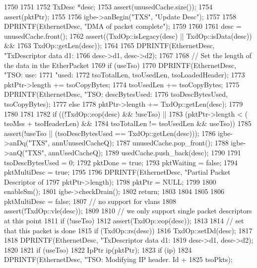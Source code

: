 \begin{DoxyCode}
1750 {
1751 
1752     TxDesc *desc;
1753     assert(unusedCache.size());
1754     assert(pktPtr);
1755 
1756     igbe->anBegin("TXS", "Update Desc");
1757 
1758     DPRINTF(EthernetDesc, "DMA of packet complete\n");
1759 
1760 
1761     desc = unusedCache.front();
1762     assert((TxdOp::isLegacy(desc) || TxdOp::isData(desc)) &&
1763            TxdOp::getLen(desc));
1764 
1765     DPRINTF(EthernetDesc, "TxDescriptor data d1: %
1766             desc->d1, desc->d2);
1767 
1768     // Set the length of the data in the EtherPacket
1769     if (useTso) {
1770         DPRINTF(EthernetDesc, "TSO: use: %
1771             "used: %
1772             tsoTotalLen, tsoUsedLen, tsoLoadedHeader);
1773         pktPtr->length += tsoCopyBytes;
1774         tsoUsedLen += tsoCopyBytes;
1775         DPRINTF(EthernetDesc, "TSO: descBytesUsed: %
1776             tsoDescBytesUsed, tsoCopyBytes);
1777     } else
1778         pktPtr->length += TxdOp::getLen(desc);
1779     
1780 
1781 
1782     if ((!TxdOp::eop(desc) && !useTso) || 
1783         (pktPtr->length < ( tsoMss + tsoHeaderLen) &&
1784          tsoTotalLen != tsoUsedLen && useTso)) {
1785         assert(!useTso || (tsoDescBytesUsed == TxdOp::getLen(desc)));
1786         igbe->anDq("TXS", annUnusedCacheQ);
1787         unusedCache.pop_front();
1788         igbe->anQ("TXS", annUsedCacheQ);
1789         usedCache.push_back(desc);
1790 
1791         tsoDescBytesUsed = 0;
1792         pktDone = true;
1793         pktWaiting = false;
1794         pktMultiDesc = true;
1795 
1796         DPRINTF(EthernetDesc, "Partial Packet Descriptor of %
1797                 pktPtr->length);
1798         pktPtr = NULL;
1799 
1800         enableSm();
1801         igbe->checkDrain();
1802         return;
1803     }
1804 
1805 
1806     pktMultiDesc = false;
1807     // no support for vlans
1808     assert(!TxdOp::vle(desc));
1809 
1810     // we only support single packet descriptors at this point
1811     if (!useTso)
1812         assert(TxdOp::eop(desc));
1813 
1814     // set that this packet is done
1815     if (TxdOp::rs(desc))
1816         TxdOp::setDd(desc);
1817 
1818     DPRINTF(EthernetDesc, "TxDescriptor data d1: %
1819             desc->d1, desc->d2);
1820 
1821     if (useTso) {
1822         IpPtr ip(pktPtr);
1823         if (ip) {
1824             DPRINTF(EthernetDesc, "TSO: Modifying IP header. Id + %
1825                     tsoPkts);
}}}
\end{DoxyCode}
